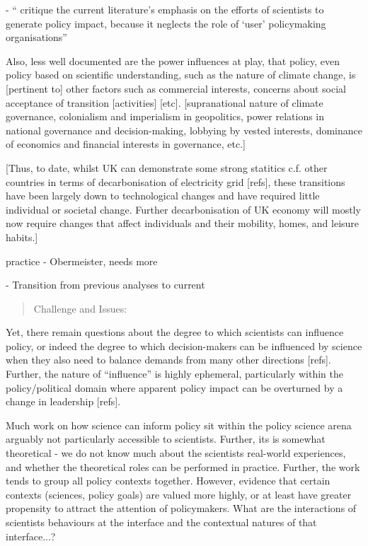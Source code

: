 \cite{EdlerKB2022} - `` critique the current literature's emphasis on the efforts of scientists to generate policy impact, because it neglects the role of `user' policymaking organisations''

Also, less well documented are the power influences at play, that policy, even policy based on scientific understanding, such as the nature of climate change, is [pertinent to] other factors such as commercial interests, concerns about social acceptance of transition [activities] [etc]. [supranational nature of climate governance, colonialism and imperialism in geopolitics, power relations in national governance and decision-making, lobbying by vested interests, dominance of economics and financial interests in governance, etc.]

[Thus, to date, whilst UK can demonstrate some strong statitics c.f. other countries in terms of decarbonisation of electricity grid [refs], these transitions have been largely down to technological changes and have required little individual or societal change. Further decarbonisation of UK economy will mostly now require changes that affect individuals and their mobility, homes, and leisure habits.]




practice - Obermeister, needs more

 - Transition from previous analyses to current

\begin{quote}
Challenge and Issues:    
\end{quote}

Yet, there remain questions about the degree to which scientists can influence policy, or indeed the degree to which decision-makers can be influenced by science when they also need to balance demands from many other directions [refs]. Further, the nature of “influence” is highly ephemeral, particularly within the policy/political domain where apparent policy impact can be overturned by a change in leadership [refs].

Much work on how science can inform policy sit within the policy science arena arguably not particularly accessible to scientists. Further, its is somewhat theoretical - we do not know much about the scientists real-world experiences, and whether the theoretical roles can be performed in practice. Further, the work tends to group all policy contexts together. However, evidence that certain contexts (sciences, policy goals) are valued more highly, or at least have greater propensity to attract the attention of policymakers. What are the interactions of scientists behaviours at the interface and the contextual natures of that interface...? 

